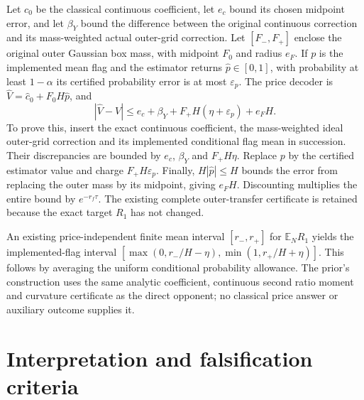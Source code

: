 \documentclass[11pt]{article}
\newcommand{\E}{\mathbb E}
\begin{document}
Let $c_0$ be the classical continuous coefficient, let $e_c$ bound its
chosen midpoint error, and let $\beta_Y$ bound the difference between the
original continuous correction and its mass-weighted actual outer-grid
correction. Let $[F_-,F_+]$ enclose the original outer Gaussian box mass,
with midpoint $F_0$ and radius $e_F$. If $p$ is the implemented mean
flag and the estimator returns $\widehat p\in[0,1]$, with probability
at least $1-\alpha$ its certified probability error is at most
$\varepsilon_p$. The price decoder is
$\widehat V=\widehat c_0+F_0H\widehat p$, and
\[
 |\widehat V-V|
 \leq e_c+\beta_Y+F_+H(\eta+\varepsilon_p)+e_FH.
 \tag{S6}\label{eq:complete-price}
\]
To prove this, insert the exact continuous coefficient, the mass-weighted
ideal outer-grid correction and its implemented conditional flag mean in
succession. Their discrepancies are bounded by $e_c$, $\beta_Y$ and
$F_+H\eta$. Replace $p$ by the certified estimator value and charge
$F_+H\varepsilon_p$. Finally, $H|\widehat p|\leq H$ bounds the error
from replacing the outer mass by its midpoint, giving $e_FH$.
Discounting multiplies the entire bound by $e^{-r_f\tau}$.
The existing complete outer-transfer certificate is retained because
the exact target $R_1$ has not changed.

An existing price-independent finite mean interval $[r_-,r_+]$ for
$\E_NR_1$ yields the implemented-flag interval
$[\max(0,r_-/H-\eta),\min(1,r_+/H+\eta)]$.
This follows by averaging the uniform conditional probability allowance.
The prior's construction uses the same analytic coefficient, continuous
second ratio moment and curvature certificate as the direct opponent;
no classical price answer or auxiliary outcome supplies it.

\section{Interpretation and falsification criteria}
\end{document}
